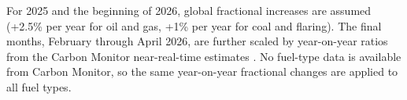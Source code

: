 \begin{description}
  For 2025 and the beginning of 2026, global fractional increases
  are assumed (+2.5\% per year for oil and gas, +1\% per year for
  coal and flaring).  The final months, February through April 2026,
  are further scaled by year-on-year ratios from the Carbon Monitor
  near-real-time estimates \citep{liu20a}.  No fuel-type data is
  available from Carbon Monitor, so the same year-on-year fractional
  changes are applied to all fuel types.

\end{description}

